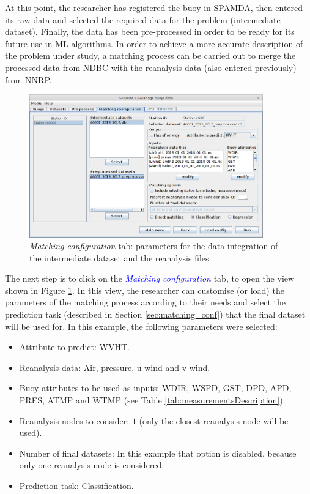 \documentclass[review]{elsarticle}
\begin{document}
			At this point, the researcher has registered the buoy in SPAMDA, then entered its raw data and selected the required data for the problem (intermediate dataset). Finally, the data has been pre-processed in order to be ready for its future use in ML algorithms. In order to achieve a more accurate description of the problem under study, a matching process can be carried out to merge the processed data from NDBC with the reanalysis data (also entered previously) from NNRP.
			
			\begin{figure}[ht!]
				\centering
				\includegraphics[width=0.90\textwidth]{figures/FigureMatching_configuration.png}
				\caption{\textit{Matching configuration} tab: parameters for the data integration of the intermediate dataset and the reanalysis files.}\label{fig:matching_conf}
			\end{figure}
			
			The next step is to click on the \textcolor{blue}{\textit{Matching configuration}} tab, to open the view shown in  Figure \ref{fig:matching_conf}. In this view, the researcher can customise (or load) the parameters of the matching process according to their needs and select the prediction task  (described in Section \ref{sec:matching_conf}) that the final dataset will be used for. In this example, the following parameters were selected:
			\begin{itemize}
				\item Attribute to predict: WVHT.
				\item Reanalysis data: Air, pressure, u-wind and v-wind.
				\item Buoy attributes to be used as inputs: WDIR, WSPD, GST, DPD, APD, PRES, ATMP and WTMP (see Table \ref{tab:measurementsDescription}).
				\item Reanalysis nodes to consider: $1$ (only the closest reanalysis node will be used).
				\item Number of final datasets: In this example that option is disabled, because only one reanalysis node is considered.
				\item Prediction task: Classification.
			\end{itemize} 
			
\end{document}
